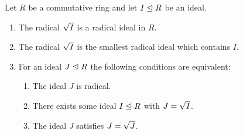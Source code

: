 \begin{lemma}
  Let $R$ be a commutative ring and let $I \trianglelefteq R$ be an ideal. 
  \begin{enumerate}
    \item
      \label{enumerate: radicals are radical}
      The radical $\sqrt{I}$ is a radical ideal in $R$.
    \item
      The radical $\sqrt{I}$ is the smallest radical ideal which contains $I$.
    \item
      For an ideal $J \trianglelefteq R$ the following conditions are equivalent:
      \begin{enumerate}
        \item
          \label{enumerate: J is radical}
          The ideal $J$ is radical.
        \item
          \label{enumerate: J is some radical}
          There exists some ideal $I \trianglelefteq R$ with $J = \sqrt{I}$.
        \item
          \label{enumerate: J is its own radical}
          The ideal $J$ satisfies $J = \sqrt{J}$.
      \end{enumerate}
  \end{enumerate}
\end{lemma}
